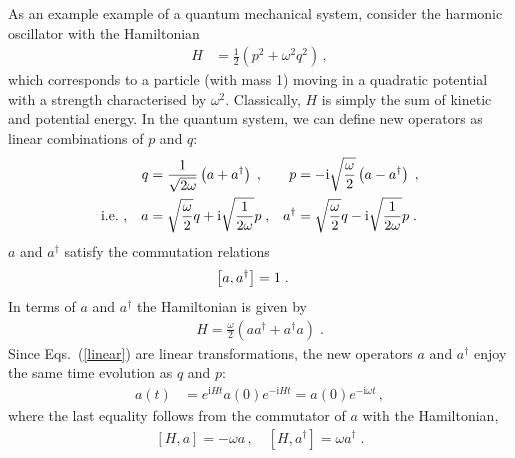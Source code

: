 \documentclass[12pt]{report}
\renewcommand{\i}{\ensuremath{\text{i}}}
\newcommand{\2}{\ensuremath{\sqrt{2}\,}}
\begin{document}
      As an example example of a quantum mechanical system, consider the harmonic
      oscillator with the Hamiltonian
      \begin{align}
        H&=\frac{1}{2}\left( p^2 +\omega^2 q^2\right)\,,
      \end{align}
      which corresponds to a particle (with mass 1) moving in a quadratic potential with a strength
      characterised by $\omega^2$. Classically, $H$ is simply the sum of kinetic and potential energy. In
      the quantum system, we can define new operators as linear combinations of $p$ and $q$:
      \begin{subequations}\label{linear}
        \begin{align}
          q&= \frac{1}{\sqrt{2\omega}} \left(a + a^\dagger\right)\;, & p&= -\i
          \sqrt{\frac{\omega}{2}} \left(a - a^\dagger\right)\;, \\
          {\rm i.e.\ ,}\quad a &=\sqrt{\frac{\omega}{2}} q +\i \sqrt{\frac{1}{2\omega}} p\;, &
          a^\dagger&=\sqrt{\frac{\omega}{2}} q -\i \sqrt{\frac{1}{2\omega}} p\;. 
        \end{align}
      \end{subequations}
      $a$ and $a^\dagger$ satisfy the commutation relations
      \begin{align}\label{eq:commaadagger}\index{Canonical commutation relations!for raising and lowering operators}
        \left[ a, a^\dagger\right] &=1\; .
      \end{align}
      In terms of $a$ and $a^\dagger$ the Hamiltonian is given by      
      \begin{align}  
      H=\frac{\omega}{2}\left( a a^\dagger +a^\dagger a\right)\;.
      \end{align} 
      Since Eqs.~(\ref{linear}) are linear transformations, the new operators $a$ and $a^\dagger$ 
      enjoy the same time evolution as $q$ and $p$:
      \begin{align}
        a(t)&= e^{\i Ht} a(0) e^{-\i Ht} = a(0) e^{-\i \omega t}\, ,
      \end{align}
      where the last equality follows from the commutator of $a$ with the Hamiltonian,     
      \begin{align}\label{eq:commHa}
        \left[H,a\right]= -\omega a\,,\quad \left[H,a^\dagger\right]=\omega a^\dagger \; .
      \end{align}
      
\end{document}
